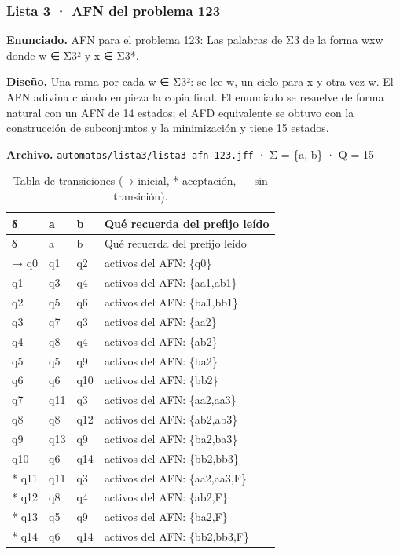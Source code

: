 
\hypertarget{lista-3-afn-del-problema-123}{%
\subsubsection{Lista 3 · AFN del problema 123}\label{lista-3-afn-del-problema-123}}

\textbf{Enunciado.} AFN para el problema 123: Las palabras de Σ3 de la forma wxw donde w ∈ Σ3² y x ∈ Σ3*.

\textbf{Diseño.} Una rama por cada w ∈ Σ3²: se lee w, un ciclo para x y otra vez w. El AFN adivina cuándo empieza la copia final. El enunciado se resuelve de forma natural con un AFN de 14 estados; el AFD equivalente se obtuvo con la construcción de subconjuntos y la minimización y tiene 15 estados.

\textbf{Archivo.} \texttt{automatas/lista3/lista3-afn-123.jff} · Σ = \{a, b\} · \textbar Q\textbar{} = 15

\begin{longtable}[]{@{}llll@{}}
\caption{Tabla de transiciones (→ inicial, * aceptación, --- sin transición).}\tabularnewline
\toprule\noalign{}
δ & a & b & Qué recuerda del prefijo leído \\
\midrule\noalign{}
\endfirsthead
\toprule\noalign{}
δ & a & b & Qué recuerda del prefijo leído \\
\midrule\noalign{}
\endhead
\bottomrule\noalign{}
\endlastfoot
→ q0 & q1 & q2 & activos del AFN: \{q0\} \\
q1 & q3 & q4 & activos del AFN: \{aa1,ab1\} \\
q2 & q5 & q6 & activos del AFN: \{ba1,bb1\} \\
q3 & q7 & q3 & activos del AFN: \{aa2\} \\
q4 & q8 & q4 & activos del AFN: \{ab2\} \\
q5 & q5 & q9 & activos del AFN: \{ba2\} \\
q6 & q6 & q10 & activos del AFN: \{bb2\} \\
q7 & q11 & q3 & activos del AFN: \{aa2,aa3\} \\
q8 & q8 & q12 & activos del AFN: \{ab2,ab3\} \\
q9 & q13 & q9 & activos del AFN: \{ba2,ba3\} \\
q10 & q6 & q14 & activos del AFN: \{bb2,bb3\} \\
* q11 & q11 & q3 & activos del AFN: \{aa2,aa3,F\} \\
* q12 & q8 & q4 & activos del AFN: \{ab2,F\} \\
* q13 & q5 & q9 & activos del AFN: \{ba2,F\} \\
* q14 & q6 & q14 & activos del AFN: \{bb2,bb3,F\} \\
\end{longtable}


